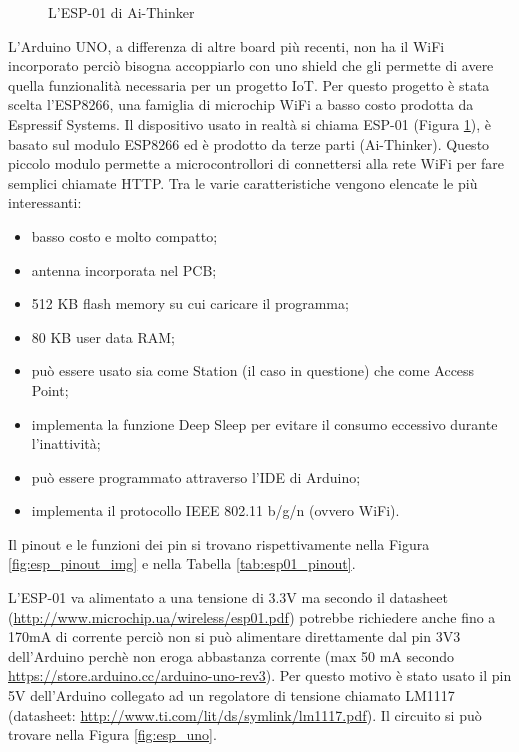 \documentclass[12pt]{report}
\begin{document}
\begin{figure}[H]
	\caption{L'ESP-01 di Ai-Thinker}
	\label{fig:esp01}
\end{figure}

L'Arduino UNO, a differenza di altre board più recenti, non ha il WiFi incorporato perciò bisogna accoppiarlo con uno shield che gli permette di avere quella funzionalità necessaria per un progetto IoT. Per questo progetto è stata scelta l'ESP8266, una famiglia di microchip WiFi a basso costo prodotta da Espressif Systems. Il dispositivo usato in realtà si chiama ESP-01 (Figura \ref{fig:esp01}), è basato sul modulo ESP8266 ed è prodotto da terze parti (Ai-Thinker). Questo piccolo modulo permette a microcontrollori di connettersi alla rete WiFi per fare semplici chiamate HTTP.
Tra le varie caratteristiche vengono elencate le più interessanti:

\begin{itemize}
	\item basso costo e molto compatto;
	\item antenna incorporata nel PCB;
	\item 512 KB flash memory su cui caricare il programma;
	\item 80 KB user data RAM;
	\item può essere usato sia come Station (il caso in questione) che come Access Point;
	\item implementa la funzione Deep Sleep per evitare il consumo eccessivo durante l'inattività;
	\item può essere programmato attraverso l'IDE di Arduino;
	\item implementa il protocollo IEEE 802.11 b/g/n (ovvero WiFi).
\end{itemize}
Il pinout e le funzioni dei pin si trovano rispettivamente nella Figura \ref{fig:esp_pinout_img} e nella Tabella \ref{tab:esp01_pinout}. 

L'ESP-01 va alimentato a una tensione di 3.3V ma secondo il datasheet (\url{http://www.microchip.ua/wireless/esp01.pdf}) potrebbe richiedere anche fino a 170mA di corrente perciò non si può alimentare direttamente dal pin 3V3 dell'Arduino perchè non eroga abbastanza corrente (max 50 mA secondo \url{https://store.arduino.cc/arduino-uno-rev3}). Per questo motivo è stato usato il pin 5V dell'Arduino collegato ad un regolatore di tensione chiamato LM1117 (datasheet: \url{http://www.ti.com/lit/ds/symlink/lm1117.pdf}). 
Il circuito si può trovare nella Figura \ref{fig:esp_uno}.
\end{document}
